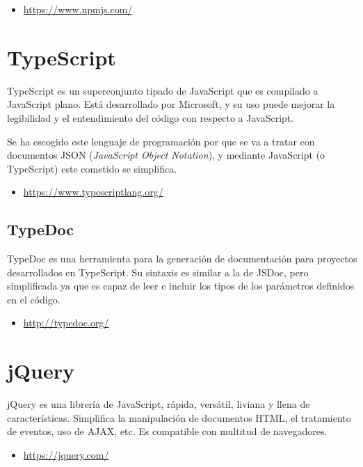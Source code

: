 \begin{itemize}
	\item \url{https://www.npmjs.com/}
\end{itemize}

\section{TypeScript}

TypeScript es un superconjunto tipado de JavaScript que es compilado a JavaScript plano. Está desarrollado por Microsoft, y su uso puede mejorar la legibilidad y el entendimiento del código con respecto a JavaScript.

Se ha escogido este lenguaje de programación por que se va a tratar con documentos JSON (\emph{JavaScript Object Notation}), y mediante JavaScript (o TypeScript) este cometido se simplifica.

\begin{itemize}
	\item \url{https://www.typescriptlang.org/}
\end{itemize}

\subsection{TypeDoc}

TypeDoc es una herramienta para la generación de documentación para proyectos desarrollados en TypeScript. Su sintaxis es similar a la de JSDoc, pero simplificada ya que es capaz de leer e incluir los tipos de los parámetros definidos en el código.

\begin{itemize}
	\item \url{http://typedoc.org/}
\end{itemize}

\section{jQuery}

jQuery es una librería de JavaScript, rápida, versátil, liviana y llena de características. Simplifica la manipulación de documentos HTML, el tratamiento de eventos, uso de AJAX, etc. Es compatible con multitud de navegadores.

\begin{itemize}
	\item \url{https://jquery.com/}
\end{itemize}

